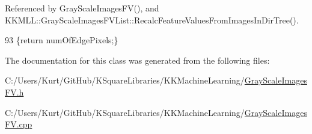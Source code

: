 Referenced by Gray\+Scale\+Images\+F\+V(), and K\+K\+M\+L\+L\+::\+Gray\+Scale\+Images\+F\+V\+List\+::\+Recalc\+Feature\+Values\+From\+Images\+In\+Dir\+Tree().


\begin{DoxyCode}
93 \{\textcolor{keywordflow}{return}  numOfEdgePixels;\}
\end{DoxyCode}


The documentation for this class was generated from the following files\+:\begin{DoxyCompactItemize}
\item 
C\+:/\+Users/\+Kurt/\+Git\+Hub/\+K\+Square\+Libraries/\+K\+K\+Machine\+Learning/\hyperlink{_gray_scale_images_f_v_8h}{Gray\+Scale\+Images\+F\+V.\+h}\item 
C\+:/\+Users/\+Kurt/\+Git\+Hub/\+K\+Square\+Libraries/\+K\+K\+Machine\+Learning/\hyperlink{_gray_scale_images_f_v_8cpp}{Gray\+Scale\+Images\+F\+V.\+cpp}\end{DoxyCompactItemize}
